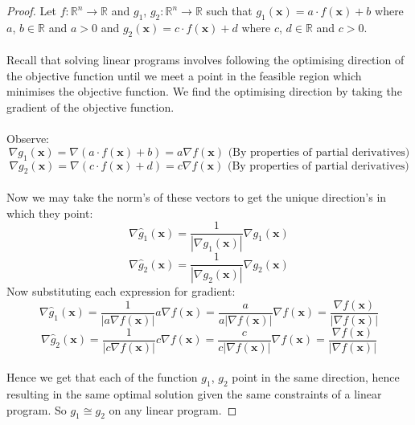 \documentclass{article}
\begin{document}
\begin{proof}Let $f:\mathbb{R}^n\rightarrow\mathbb{R}$ and $g_1$, $g_2 : \mathbb{R}^n\rightarrow\mathbb{R}$ such that $g_1(\boldsymbol{x}) = a\cdot f(\boldsymbol{x}) + b$ where $a$, $b \in \mathbb{R}$ and $a > 0$ and $g_2(\boldsymbol{x}) = c\cdot f(\boldsymbol{x}) + d$ where $c$, $d \in \mathbb{R}$ and $c > 0$.

\paragraph{}Recall that solving linear programs involves following the optimising direction of the objective function until we meet a point in the feasible region which minimises the objective function. We find the optimising direction by taking the gradient of the objective function.

\paragraph{}Observe:
$$\nabla g_1 (\boldsymbol{x}) = \nabla (a \cdot f(\boldsymbol{x}) + b) = a\nabla f(\boldsymbol{x}) \text{ (By properties of partial derivatives)}$$
$$\nabla g_2 (\boldsymbol{x})= \nabla (c \cdot f(\boldsymbol{x}) + d) = c\nabla f(\boldsymbol{x}) \text{ (By properties of partial derivatives)}$$

\paragraph{}Now we may take the norm's of these vectors to get the unique direction's in which they point:
$$\nabla \hat g_1 (\boldsymbol{x}) = \frac{1}{|\nabla g_1(\boldsymbol{x})|} \nabla g_1(\boldsymbol{x})$$
$$\nabla \hat g_2 (\boldsymbol{x}) = \frac{1}{|\nabla g_2(\boldsymbol{x})|} \nabla g_2(\boldsymbol{x})$$
Now substituting each expression for gradient:
$$\nabla \hat g_1 (\boldsymbol{x}) = \frac{1}{|a \nabla f(\boldsymbol{x})|} a \nabla f(\boldsymbol{x}) = \frac{a}{a| \nabla f(\boldsymbol{x})|}  \nabla f(\boldsymbol{x}) = \frac{\nabla f(\boldsymbol{x})}{| \nabla f(\boldsymbol{x})|}$$
$$\nabla \hat g_2 (\boldsymbol{x}) = \frac{1}{|c \nabla f(\boldsymbol{x})|} c \nabla f(\boldsymbol{x}) = \frac{c}{c| \nabla f(\boldsymbol{x})|}  \nabla f(\boldsymbol{x}) = \frac{\nabla f(\boldsymbol{x})}{| \nabla f(\boldsymbol{x})|}$$

\paragraph{}Hence we get that each of the function $g_1$, $g_2$ point in the same direction, hence resulting in the same optimal solution given the same constraints of a linear program. So $g_1 \cong g_2$ on any linear program.
\end{proof}
\end{document}
